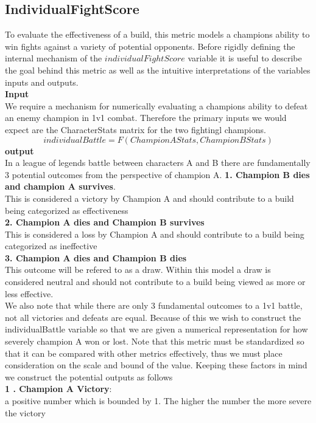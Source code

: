\documentclass{article}
\begin{document}
\subsection{IndividualFightScore} 
To evaluate the effectiveness of a build, this metric models a champions ability to win fights against a variety of potential opponents.  Before rigidly defining the internal mechanism of the $individualFightScore$ variable it is useful to describe the goal behind this metric as well as the intuitive interpretations of the variables inputs and outputs.  \\
{\bf{Input}}\\
We require a mechanism for numerically evaluating a champions ability to defeat an enemy champion in 1v1 combat.  Therefore the primary inputs we would expect are the CharacterStats matrix for the two fightingl champions.  
\begin{equation}
individualBattle = F(ChampionAStats, ChampionBStats)
\end{equation}
{\bf{output}}\\
In a league of legends battle between characters A and B there are fundamentally 3 potential outcomes from the perspective of champion A.
{\bf{1.  Champion B dies and champion A survives}}. \\
 This is considered a victory by  Champion A and should contribute to a build being categorized as effectiveness\\
{\bf{2.  Champion A dies and Champion B survives}}\\
This is considered a loss by Champion A and should contribute to a build being categorized as ineffective\\
{\bf{3.  Champion A dies and Champion B dies}} \\  This outcome will be refered to as a draw.  Within this model a draw is considered neutral and should not contribute to a build being viewed as more or less effective.\\
We also note that while there are only 3 fundamental outcomes to a 1v1 battle, not all victories and defeats are equal.  Because of this we wish to construct the individualBattle variable so that we are given a numerical representation for how severely champion A won or lost.    Note that this metric must be standardized so that it can be compared with other metrics effectively, thus we must place consideration on the scale and bound of the value.  Keeping these factors in mind we construct the potential outputs as follows\\
{\bf{1 . Champion A Victory}}: \\ a positive number which is bounded by 1.  The higher the number the more severe the victory\\
\end{document}
